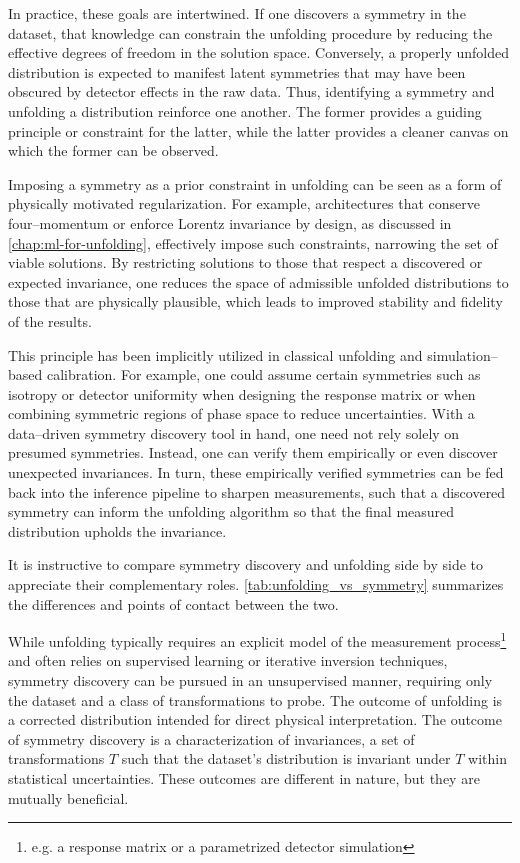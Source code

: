         In practice, these goals are intertwined.
        If one discovers a symmetry in the dataset, that knowledge can constrain the unfolding procedure by reducing the effective degrees of freedom in the solution space.
        Conversely, a properly unfolded distribution is expected to manifest latent symmetries that may have been obscured by detector effects in the raw data.
        Thus, identifying a symmetry and unfolding a distribution reinforce one another.
        The former provides a guiding principle or constraint for the latter, while the latter provides a cleaner canvas on which the former can be observed.
    
        Imposing a symmetry as a prior constraint in unfolding can be seen as a form of physically motivated regularization.
        For example, architectures that conserve four--momentum or enforce Lorentz invariance by design, as discussed in \cref{chap:ml-for-unfolding}, effectively impose such constraints, narrowing the set of viable solutions.
        By restricting solutions to those that respect a discovered or expected invariance, one reduces the space of admissible unfolded distributions to those that are physically plausible, which leads to improved stability and fidelity of the results.
    
        This principle has been implicitly utilized in classical unfolding and simulation--based calibration.
        For example, one could assume certain symmetries such as isotropy or detector uniformity when designing the response matrix or when combining symmetric regions of phase space to reduce uncertainties.
        With a data--driven symmetry discovery tool in hand, one need not rely solely on presumed symmetries.
        Instead, one can verify them empirically or even discover unexpected invariances.
        In turn, these empirically verified symmetries can be fed back into the inference pipeline to sharpen measurements, such that a discovered symmetry can inform the unfolding algorithm so that the final measured distribution upholds the invariance.
    
        It is instructive to compare symmetry discovery and unfolding side by side to appreciate their complementary roles.
        \cref{tab:unfolding_vs_symmetry} summarizes the differences and points of contact between the two.
    
        While unfolding typically requires an explicit model of the measurement process\footnote{e.g. a response matrix or a parametrized detector simulation} and often relies on supervised learning or iterative inversion techniques, symmetry discovery can be pursued in an unsupervised manner, requiring only the dataset and a class of transformations to probe.
        The outcome of unfolding is a corrected distribution intended for direct physical interpretation.
        The outcome of symmetry discovery is a characterization of invariances, a set of transformations $T$ such that the dataset’s distribution is invariant under $T$ within statistical uncertainties.
        These outcomes are different in nature, but they are mutually beneficial.
    
